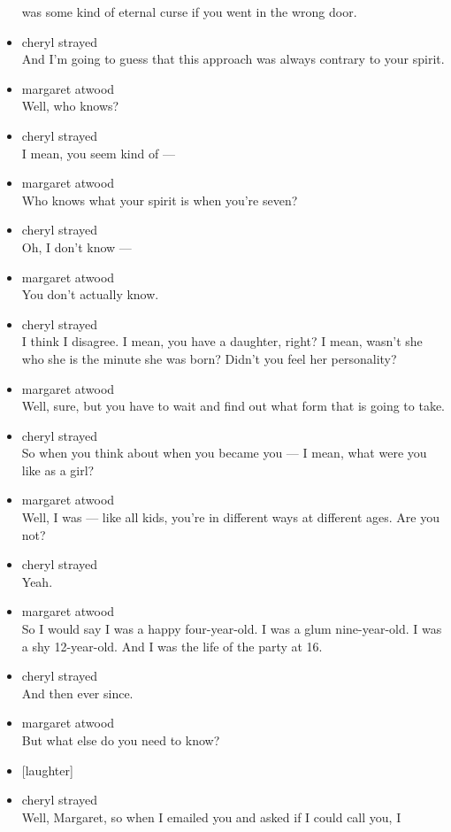 \begin{itemize}
  was some kind of eternal curse if you went in the wrong door.
\item
  cheryl strayed\\
  And I'm going to guess that this approach was always contrary to your
  spirit.
\item
  margaret atwood\\
  Well, who knows?
\item
  cheryl strayed\\
  I mean, you seem kind of ---
\item
  margaret atwood\\
  Who knows what your spirit is when you're seven?
\item
  cheryl strayed\\
  Oh, I don't know ---
\item
  margaret atwood\\
  You don't actually know.
\item
  cheryl strayed\\
  I think I disagree. I mean, you have a daughter, right? I mean, wasn't
  she who she is the minute she was born? Didn't you feel her
  personality?
\item
  margaret atwood\\
  Well, sure, but you have to wait and find out what form that is going
  to take.
\item
  cheryl strayed\\
  So when you think about when you became you --- I mean, what were you
  like as a girl?
\item
  margaret atwood\\
  Well, I was --- like all kids, you're in different ways at different
  ages. Are you not?
\item
  cheryl strayed\\
  Yeah.
\item
  margaret atwood\\
  So I would say I was a happy four-year-old. I was a glum
  nine-year-old. I was a shy 12-year-old. And I was the life of the
  party at 16.
\item
  cheryl strayed\\
  And then ever since.
\item
  margaret atwood\\
  But what else do you need to know?
\item
  {[}laughter{]}
\item
  cheryl strayed\\
  Well, Margaret, so when I emailed you and asked if I could call you, I

\end{itemize}
